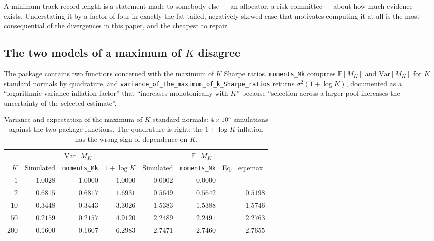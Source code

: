 \documentclass[11pt,a4paper]{article}
\newcommand{\code}[1]{\texttt{#1}}
\begin{document}
A minimum track record length is a statement made to somebody else --- an
allocator, a risk committee --- about how much evidence exists. Understating
it by a factor of four in exactly the fat-tailed, negatively skewed case that
motivates computing it at all is the most consequential of the divergences in
this paper, and the cheapest to repair.

\subsection{The two models of a maximum of \texorpdfstring{$K$}{K} disagree}
\label{sec:maxk}

The package contains two functions concerned with the maximum of $K$ Sharpe
ratios. \code{moments\_Mk} computes $\mathbb{E}[M_K]$ and
$\mathrm{Var}[M_K]$ for $K$ standard normals by quadrature, and
\code{variance\_of\_the\_maximum\_of\_k\_Sharpe\_ratios} returns
$\sigma^2 (1 + \log K)$, documented as a ``logarithmic variance inflation
factor'' that ``increases monotonically with $K$'' because ``selection across
a larger pool increases the uncertainty of the selected estimate''.

\begin{table}[t]
\centering
\caption{Variance and expectation of the maximum of $K$ standard normals:
$4 \times 10^5$ simulations against the two package functions. The
quadrature is right; the $1 + \log K$ inflation has the wrong sign of
dependence on $K$.}
\label{tab:maxk}
\begin{tabular}{rrrrrrr}
\toprule
& \multicolumn{3}{c}{$\mathrm{Var}[M_K]$} & \multicolumn{3}{c}{$\mathbb{E}[M_K]$} \\
\cmidrule(lr){2-4}\cmidrule(lr){5-7}
$K$ & Simulated & \code{moments\_Mk} & $1 + \log K$ & Simulated & \code{moments\_Mk} & Eq.~\eqref{eq:emax} \\
\midrule
$1$   & $1.0028$ & $1.0000$ & $1.0000$ & $0.0002$ & $0.0000$ & --- \\
$2$   & $0.6815$ & $0.6817$ & $1.6931$ & $0.5649$ & $0.5642$ & $0.5198$ \\
$10$  & $0.3448$ & $0.3443$ & $3.3026$ & $1.5383$ & $1.5388$ & $1.5746$ \\
$50$  & $0.2159$ & $0.2157$ & $4.9120$ & $2.2489$ & $2.2491$ & $2.2763$ \\
$200$ & $0.1600$ & $0.1607$ & $6.2983$ & $2.7471$ & $2.7460$ & $2.7655$ \\
\bottomrule
\end{tabular}
\end{table}
\end{document}
